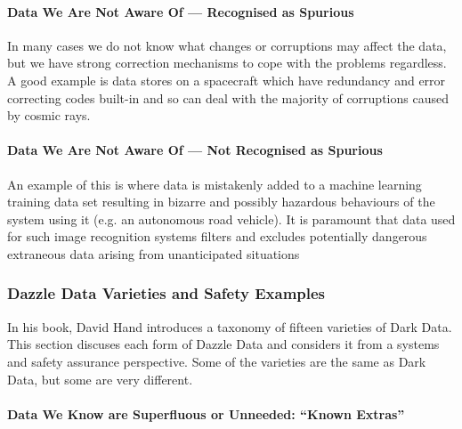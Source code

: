 \paragraph{Data We Are Not Aware Of --- Recognised as Spurious}
In many cases we do not know what changes or corruptions may affect the data, but we have strong correction mechanisms to cope with the problems regardless. A good example is data stores on a spacecraft which have redundancy and error correcting codes built-in and so can deal with the majority of corruptions caused by cosmic rays.

\paragraph{Data We Are Not Aware Of --- Not Recognised as Spurious}
An example of this is where data is mistakenly added to a machine learning training data set resulting in bizarre and possibly hazardous behaviours of the system using it (e.g. an autonomous road vehicle). It is paramount that data used for such image recognition systems filters and excludes potentially dangerous extraneous data arising from unanticipated situations 

\subsubsection{Dazzle Data Varieties and Safety Examples}
In his book, David Hand introduces a taxonomy of fifteen varieties of Dark Data. This section discuses each form of Dazzle Data and considers it from a systems and safety assurance perspective.
Some of the varieties are the same as Dark Data, but some are very different.

\paragraph{Data We Know are Superfluous or Unneeded: ``Known Extras''}
\label{bkm:dazzledata:case1}

